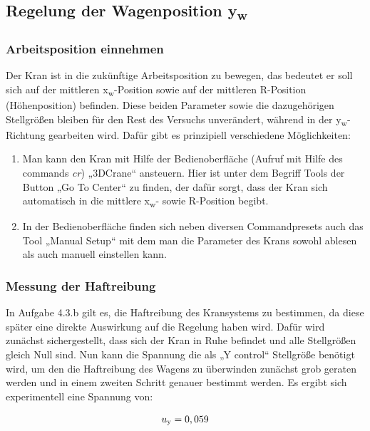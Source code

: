 \documentclass[10pt]{scrartcl}
\begin{document}
\subsection{Regelung der Wagenposition y\textsubscript{w}}


\subsubsection {Arbeitsposition einnehmen}
Der Kran ist in die zukünftige Arbeitsposition zu bewegen, das bedeutet er soll sich auf der mittleren x\textsubscript{w}-Position sowie auf der mittleren R-Position (Höhenposition) befinden. Diese beiden Parameter sowie die dazugehörigen Stellgrößen bleiben für den Rest des Versuchs unverändert, während in der y\textsubscript{w}-Richtung gearbeiten wird. 
Dafür gibt es prinzipiell verschiedene Möglichkeiten:

\begin{enumerate}
\item Man kann den Kran mit Hilfe der Bedienoberfläche (Aufruf mit Hilfe des commands \textit{cr}) „3DCrane“ ansteuern. Hier ist unter dem Begriff Tools der Button „Go To Center“ zu finden, der dafür sorgt, dass der Kran sich automatisch in die mittlere x\textsubscript{w}- sowie R-Position begibt.
\item In der Bedienoberfläche finden sich neben diversen Commandpresets auch das Tool „Manual Setup“ mit dem man die Parameter des Krans sowohl ablesen als auch manuell einstellen kann.
\end{enumerate}


\subsubsection {Messung der Haftreibung}

In Aufgabe 4.3.b gilt es, die Haftreibung des Kransystems zu bestimmen, da diese später eine direkte Auswirkung auf die Regelung haben wird. Dafür wird  zunächst sichergestellt, dass sich der Kran in Ruhe befindet und alle Stellgrößen gleich Null sind. Nun kann die Spannung die als „Y control“ Stellgröße benötigt wird, um den die Haftreibung des Wagens zu überwinden zunächst grob geraten werden und in einem zweiten Schritt genauer bestimmt werden. Es ergibt sich experimentell eine Spannung von:

\begin {align}
 u\textsubscript{y} = 0,059 
\end{align}
\end{document}
